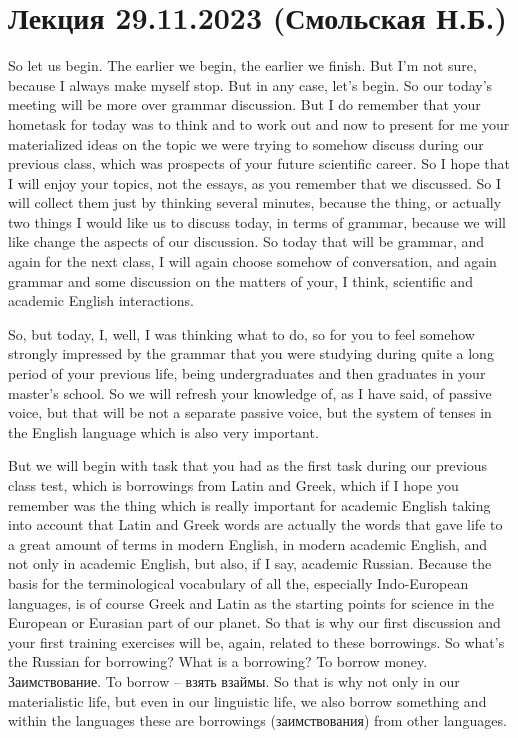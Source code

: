 \documentclass[main.tex]{subfiles}
\begin{document}
\section{Лекция 29.11.2023 (Смольская Н.Б.)}

So let us begin.
The earlier we begin, the earlier we finish.
But I'm not sure, because I always make myself stop.
But in any case, let's begin.
So our today's meeting will be more over grammar discussion.
But I do remember that your hometask for today was to think and to work out and now to present for me your materialized ideas on the topic we were trying to somehow discuss during our previous class, which was prospects of your future scientific career.
So I hope that I will enjoy your topics, not the essays, as you remember that we discussed.
So I will collect them just by thinking several minutes, because the thing, or actually two things I would like us to discuss today, in terms of grammar, because we will like change the aspects of our discussion.
So today that will be grammar, and again for the next class, I will again choose somehow of conversation, and again grammar and some discussion on the matters of your, I think, scientific and academic English interactions.

So, but today, I, well, I was thinking what to do, so for you to feel somehow strongly impressed by the grammar that you were studying during quite a long period of your previous life, being undergraduates and then graduates in your master's school.
So we will refresh your knowledge of, as I have said, of passive voice, but that will be not a separate passive voice, but the system of tenses in the English language which is also very important.

But we will begin with task that you had as the first task during our previous class test, which is borrowings from Latin and Greek, which if I hope you remember was the thing which is really important for academic English taking into account that Latin and Greek words are actually the words that gave life to a great amount of terms in modern English, in modern academic English, and not only in academic English, but also, if I say, academic Russian.
Because the basis for the terminological vocabulary of all the, especially Indo-European languages, is of course Greek and Latin as the starting points for science in the European or Eurasian part of our planet.
So that is why our first discussion and your first training exercises will be, again, related to these borrowings.
So what's the Russian for borrowing? What is a borrowing? To borrow money.
Заимствование.
To borrow -- взять взаймы.
So that is why not only in our materialistic life, but even in our linguistic life, we also borrow something and within the languages these are borrowings (заимствования) from other languages.
\end{document}
